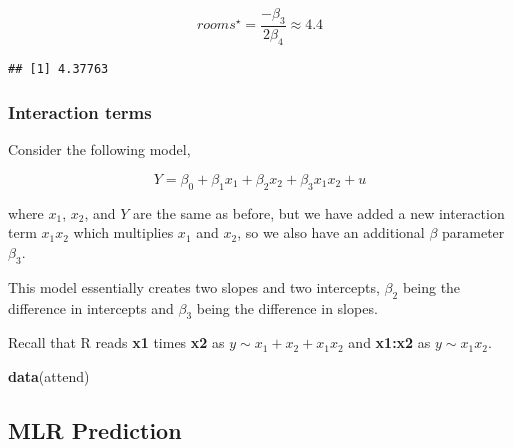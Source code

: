 \documentclass[]{book}
\newenvironment{Shaded}{\begin{snugshade}}{\end{snugshade}}
\newcommand{\DecValTok}[1]{\textcolor[rgb]{0.00,0.00,0.81}{#1}}
\newcommand{\KeywordTok}[1]{\textcolor[rgb]{0.13,0.29,0.53}{\textbf{#1}}}
\newcommand{\NormalTok}[1]{#1}
\newcommand{\OperatorTok}[1]{\textcolor[rgb]{0.81,0.36,0.00}{\textbf{#1}}}
\newcommand{\StringTok}[1]{\textcolor[rgb]{0.31,0.60,0.02}{#1}}
\begin{document}
\begin{equation}
rooms^{\star} = \frac{-\beta_3}{2\beta_4} \approx 4.4
\end{equation}

\begin{Shaded}
\end{Shaded}

\begin{verbatim}
## [1] 4.37763
\end{verbatim}

\hypertarget{interaction-terms}{%
\subsubsection{Interaction terms}\label{interaction-terms}}

Consider the following model,

\begin{equation}
Y = {\beta}_{0} + {\beta}_{1}x_{1} +  {\beta}_{2}x_{2} + {\beta}_{3}x_{1}x_{2} + u    
\label{eq:interactionterm}
\end{equation}

where \(x_1\), \(x_2\), and \(Y\) are the same as before, but we have
added a new interaction term \(x_1x_2\) which multiplies \(x_1\) and
\(x_2\), so we also have an additional \(\beta\) parameter \(\beta_3\).

This model essentially creates two slopes and two intercepts,
\(\beta_2\) being the difference in intercepts and \(\beta_3\) being the
difference in slopes.

Recall that R reads \textbf{x1} times \textbf{x2} as
\(y \sim x_1+x_2+x_1x_2\) and \textbf{x1:x2} as \(y \sim x_1x_2\).

\begin{Shaded}
\begin{Highlighting}[]
\KeywordTok{data}\NormalTok{(attend)}
\end{Highlighting}
\end{Shaded}

\hypertarget{mlr-prediction}{%
\subsection{MLR Prediction}\label{mlr-prediction}}
\end{document}
